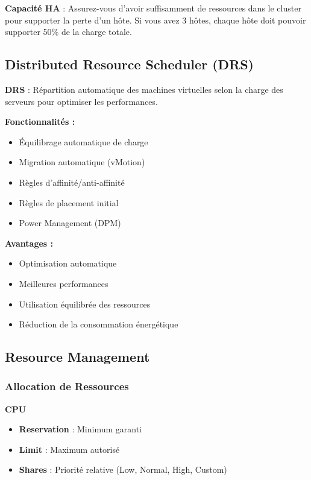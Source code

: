 \documentclass[11pt,a4paper]{article}
\begin{document}
\begin{tipbox}
\textbf{Capacité HA} : Assurez-vous d'avoir suffisamment de ressources dans le cluster pour supporter la perte d'un hôte. Si vous avez 3 hôtes, chaque hôte doit pouvoir supporter 50\% de la charge totale.
\end{tipbox}

\subsection{Distributed Resource Scheduler (DRS)}

\begin{definitionbox}
\textbf{DRS} : Répartition automatique des machines virtuelles selon la charge des serveurs pour optimiser les performances.
\end{definitionbox}

\textbf{Fonctionnalités :}
\begin{itemize}
    \item Équilibrage automatique de charge
    \item Migration automatique (vMotion)
    \item Règles d'affinité/anti-affinité
    \item Règles de placement initial
    \item Power Management (DPM)
\end{itemize}

\textbf{Avantages :}
\begin{itemize}
    \item Optimisation automatique
    \item Meilleures performances
    \item Utilisation équilibrée des ressources
    \item Réduction de la consommation énergétique
\end{itemize}

\subsection{Resource Management}

\subsubsection{Allocation de Ressources}

\textbf{CPU}
\begin{itemize}
    \item \textbf{Reservation} : Minimum garanti
    \item \textbf{Limit} : Maximum autorisé
    \item \textbf{Shares} : Priorité relative (Low, Normal, High, Custom)
\end{itemize}
\end{document}
